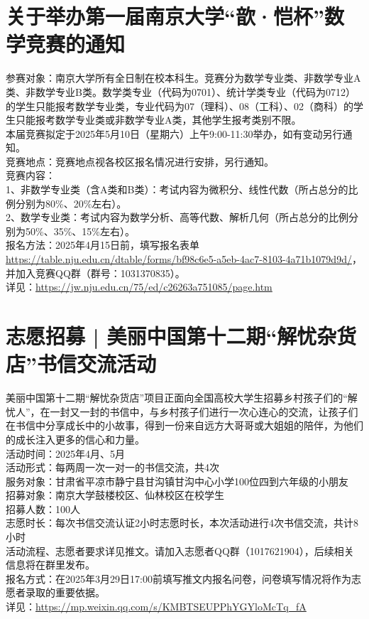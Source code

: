 \documentclass[letterpaper, 12pt]{article}
\begin{document}
\begin{multicols}{2}
\section{关于举办第一届南京大学“歆·恺杯”数学竞赛的通知}
参赛对象：南京大学所有全日制在校本科生。竞赛分为数学专业类、非数学专业A类、非数学专业B类。数学类专业（代码为0701）、统计学类专业（代码为0712）的学生只能报考数学专业类，专业代码为07（理科）、08（工科）、02（商科）的学生只能报考数学专业类或非数学专业A类，其他学生报考类别不限。
\\本届竞赛拟定于2025年5月10日（星期六）上午9:00-11:30举办，如有变动另行通知。
\\竞赛地点：竞赛地点视各校区报名情况进行安排，另行通知。
\\竞赛内容：
\\1、非数学专业类（含A类和B类）：考试内容为微积分、线性代数（所占总分的比例分别为80\%、20\%左右）。
\\2、数学专业类：考试内容为数学分析、高等代数、解析几何（所占总分的比例分别为50\%、35\%、15\%左右）。
\\报名方法：2025年4月15日前，填写报名表单\url{https://table.nju.edu.cn/dtable/forms/bf98c6e5-a5eb-4ac7-8103-4a71b1079d9d/}，并加入竞赛QQ群（群号：1031370835）。
\\详见：\url{https://jw.nju.edu.cn/75/ed/c26263a751085/page.htm}
\section{志愿招募 | 美丽中国第十二期“解忧杂货店”书信交流活动}
美丽中国第十二期“解忧杂货店”项目正面向全国高校大学生招募乡村孩子们的“解忧人”，在一封又一封的书信中，与乡村孩子们进行一次心连心的交流，让孩子们在书信中分享成长中的小故事，得到一份来自远方大哥哥或大姐姐的陪伴，为他们的成长注入更多的信心和力量。
\\活动时间：2025年4月、5月
\\活动形式：每两周一次一对一的书信交流，共4次
\\服务对象：甘肃省平凉市静宁县甘沟镇甘沟中心小学100位四到六年级的小朋友
\\招募对象：南京大学鼓楼校区、仙林校区在校学生
\\招募人数：100人
\\志愿时长：每次书信交流认证2小时志愿时长，本次活动进行4次书信交流，共计8小时
\\活动流程、志愿者要求详见推文。请加入志愿者QQ群（1017621904），后续相关信息将在群里发布。
\\报名方式：在2025年3月29日17:00前填写推文内报名问卷，问卷填写情况将作为志愿者录取的重要依据。
\\详见：\url{https://mp.weixin.qq.com/s/KMBTSEUPPhYGYloMcTq_fA}

\end{multicols}
\end{document}
